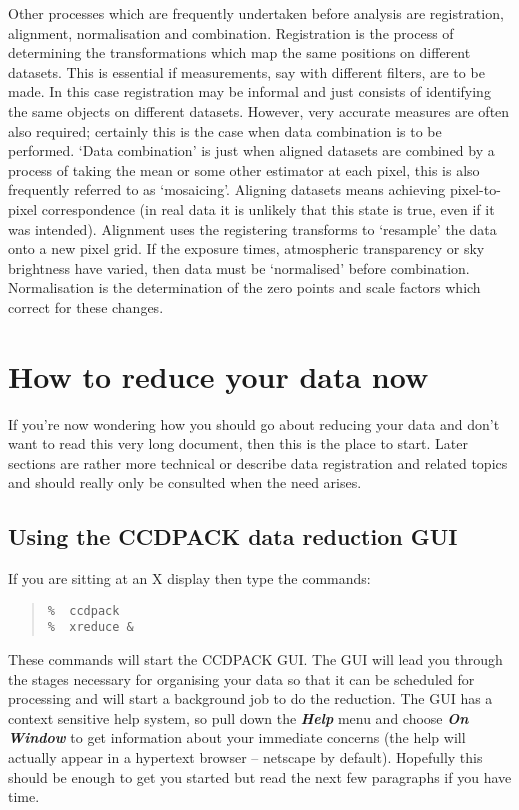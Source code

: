 \documentclass[twoside,11pt]{article}
\newcommand{\latexhtml}[2]{#1}
\newcommand{\xlabel}[1]{}
\renewcommand{\_}{\texttt{\symbol{95}}}
\newcommand{\ttsize}{\latexhtml{\small}{}}
\newenvironment{myquote}{\begin{quote}\ttsize}{\end{quote}}
\newcommand{\menu}[1]{{\ttsize \bf \em #1}}
\begin{document}
Other processes which are frequently undertaken before analysis are
registration, alignment, normalisation and combination. Registration is
the process of determining the transformations which map the same
positions on different datasets. This is essential if measurements, say
with different filters, are to be made. In this case registration may be
informal and just consists of identifying the same objects on different
datasets. However, very accurate measures are often also required;
certainly this is the case when data combination is to be performed.
`Data combination' is just when aligned datasets are combined by a
process of taking the mean or some other estimator at each pixel, this
is also frequently referred to as `mosaicing'. Aligning datasets
means achieving pixel-to-pixel correspondence (in real data it is
unlikely that this state is true, even if it was intended).
Alignment uses the registering transforms to `resample' the data onto
a new pixel grid. If the exposure times, atmospheric transparency or
sky brightness have varied, then data must be `normalised' before
combination. Normalisation is the determination of the zero points and
scale factors which correct for these changes.

\section{How to reduce your data now}

If you're now wondering how you should go about reducing your data and
don't want to read this very long document, then this is the place to
start. Later sections are rather more technical or describe data
registration and related topics and should really only be consulted
when the need arises.

\subsection{Using the CCDPACK data reduction GUI 
            \label{usingxreduce}\xlabel{usingxreduce}}

If you are sitting at an X display then type the commands:
\begin{myquote}
\begin{verbatim}
%  ccdpack
%  xreduce &
\end{verbatim}
\end{myquote}
These commands will start the CCDPACK GUI.  The GUI will lead you
through the stages necessary for organising your data so that it can
be scheduled for processing and will start a background job to do the
reduction.  The GUI has a context sensitive help system, so pull down
the \menu{Help} menu and choose \menu{On Window} to get information
about your immediate concerns (the help will actually appear in a
hypertext browser -- netscape by default). Hopefully this should be
enough to get you started but read the next few paragraphs if you have
time.
\end{document}
